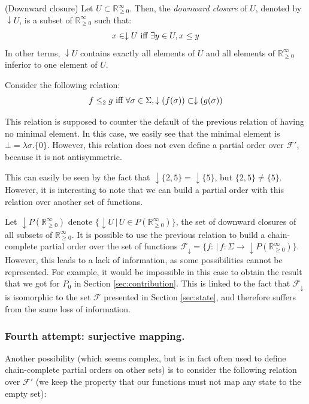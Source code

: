 \documentclass[a4paper,10pt]{llncs}
\def\RRposi {{\mathbb R_{\geq 0}^{\infty}}}
\begin{document}
\begin{definition}{\textnormal{(Downward closure)\newline}}
Let $U \subset \RRposi$. Then, the \emph{downward closure} of $U$, denoted by $\downarrow U$, is a subset of $\RRposi$ such that:
$$x \in \downarrow U \textnormal{ iff } \exists y \in U, x \leq y$$
In other terms, $\downarrow U$ contains exactly all elements of $U$ and all elements of $\RRposi$ inferior to one element of $U$.
\end{definition}

Consider the following relation:
$$f \leq_2 g \textnormal{ iff } \forall \sigma \in \Sigma, \downarrow(f(\sigma)) \subset \downarrow(g(\sigma))$$

This relation is supposed to counter the default of the previous relation of having no minimal element. In this case, we easily see that the minimal element is $\bot = \lambda\sigma.\{0\}$.
However, this relation does not even define a partial order over $\mathcal{F}'$, because it is not antisymmetric.\bigskip

This can easily be seen by the fact that $\downarrow\{2,5\} = \downarrow \{5\}$, but $\{2,5\} \neq \{5\}$. However, it is interesting to note that we can build a partial order with this relation over another set of functions.\bigskip

Let $\downarrow P(\RRposi)$ denote $\{\downarrow U \,|\, U \in P(\RRposi)\}$, the set of downward closures of all subsets of $\RRposi$. It is possible to use the previous relation to build a chain-complete partial order over the set of functions $\mathcal{F}_\downarrow = \{f : \,|\, f : \Sigma \rightarrow \downarrow P(\RRposi)\}$. However, this leads to a lack of information, as some possibilities cannot be represented. For example, it would be impossible in this case to obtain the result that we got for $P_0$ in Section \ref{sec:contribution}. This is linked to the fact that $\mathcal{F}_\downarrow$ is isomorphic to the set $\mathcal{F}$ presented in Section \ref{sec:state}, and therefore suffers from the same loss of information.


\subsubsection{Fourth attempt: surjective mapping.}
Another possibility (which seems complex, but is in fact often used to define chain-complete partial orders on other sets) is to consider the following relation over $\mathcal{F}'$ (we keep the property that our functions must not map any state to the empty set):
\end{document}
